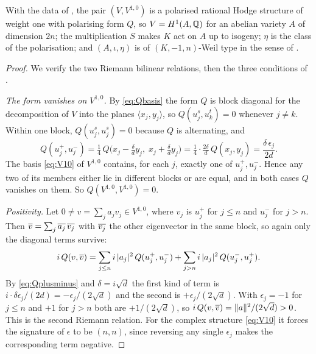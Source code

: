 \begin{theorem}\label{thm:model}
With the data of , the pair $(V,V^{1,0})$ is a
polarised rational Hodge structure of weight one with polarising form $Q$, so
$V=H^{1}(A,\mathbb{Q})$ for an abelian variety $A$ of dimension $2n$; the
multiplication $S$ makes $K$ act on $A$ up to isogeny; $\eta$ is the class of
the polarisation; and $(A,\iota,\eta)$ is of $(K,-1,n)$-Weil type in the sense
of .
\end{theorem}

\begin{proof}
We verify the two Riemann bilinear relations, then the three conditions of
.

\emph{The form vanishes on $V^{1,0}$.} By \eqref{eq:Qbasis} the form $Q$ is
block diagonal for the decomposition of $V$ into the planes
$\langle x_{j},y_{j}\rangle$, so $Q(u_{j}^{s},u_{k}^{t})=0$ whenever $j\ne k$.
Within one block, $Q(u_{j}^{s},u_{j}^{s})=0$ because $Q$ is alternating, and
\begin{equation}\label{eq:Qplusminus}
  Q(u_{j}^{+},u_{j}^{-})
  =\tfrac14\,Q\bigl(x_{j}-\tfrac{\delta}{d}y_{j},\;
                    x_{j}+\tfrac{\delta}{d}y_{j}\bigr)
  =\tfrac14\cdot\tfrac{2\delta}{d}\,Q(x_{j},y_{j})
  =\frac{\delta\,\epsilon_{j}}{2d}.
\end{equation}
The basis \eqref{eq:V10} of $V^{1,0}$ contains, for each $j$, exactly one of
$u_{j}^{+},u_{j}^{-}$. Hence any two of its members either lie in different
blocks or are equal, and in both cases $Q$ vanishes on them. So
$Q(V^{1,0},V^{1,0})=0$.

\emph{Positivity.} Let $0\ne v=\sum_{j}a_{j}v_{j}\in V^{1,0}$, where $v_{j}$ is
$u_{j}^{+}$ for $j\le n$ and $u_{j}^{-}$ for $j>n$. Then
$\overline{v}=\sum_{j}\overline{a_{j}}\,\overline{v_{j}}$ with $\overline{v_{j}}$ the other
eigenvector in the same block, so again only the diagonal terms survive:
\[
  i\,Q(v,\overline{v})
  =\sum_{j\le n}i\,|a_{j}|^{2}\,Q(u_{j}^{+},u_{j}^{-})
   +\sum_{j>n}i\,|a_{j}|^{2}\,Q(u_{j}^{-},u_{j}^{+}) .
\]
By \eqref{eq:Qplusminus} and $\delta=i\sqrt{d}$ the first kind of term is
$i\cdot\delta\epsilon_{j}/(2d)=-\epsilon_{j}/(2\sqrt{d})$ and the second is
$+\epsilon_{j}/(2\sqrt{d})$. With $\epsilon_{j}=-1$ for $j\le n$ and $+1$ for
$j>n$ both are $+1/(2\sqrt{d})$, so $i\,Q(v,\overline{v})=\|a\|^{2}/(2\sqrt{d})>0$.
This is the second Riemann relation. For the complex structure
\eqref{eq:V10} it forces the signature of $\epsilon$ to be $(n,n)$, since
reversing any single $\epsilon_{j}$ makes the corresponding term negative.


\end{proof}

